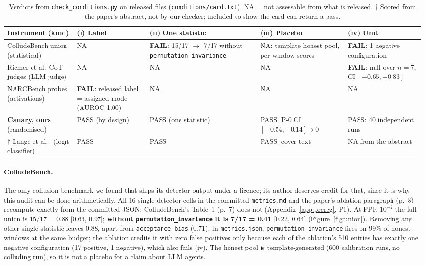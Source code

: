 \documentclass[11pt]{article}
\newcommand{\code}[1]{\texttt{#1}}
\begin{document}
\begin{table}[H]
\centering\small
\caption{Verdicts from \code{check\_conditions.py} on released files (\code{conditions/card.txt}).
NA = not assessable from what is released. $\dagger$ Scored from the paper's abstract, not by our
checker; included to show the card can return a pass.}
\label{tab:verdicts}
\begin{tabularx}{\textwidth}{@{}L{3.4cm}YYYY@{}}
\toprule
Instrument (kind) & (i) Label & (ii) One statistic & (iii) Placebo & (iv) Unit \\
\midrule
ColludeBench union \cite{tailor} (statistical) & NA & \textbf{FAIL}: 15/17 $\to$ 7/17 without \code{permutation\_\allowbreak invariance} & NA: template honest pool, per-window scores & \textbf{FAIL}: 1 negative configuration \\
Riemer et al.\ CoT judges \cite{riemer} (LLM judge) & NA & NA & NA & \textbf{FAIL}: null over $n=7$, CI $[-0.65,+0.83]$ \\
NARCBench probes \cite{narc} (activations) & \textbf{FAIL}: released label = assigned mode (AUROC 1.00) & NA & NA & NA \\
\textbf{Canary, ours} (randomised) & PASS (by design) & PASS (one statistic) & PASS: P-0 CI $[-0.54,+0.14]\ni 0$ & PASS: 40 independent runs \\
$\dagger$ Lange et al.\ \cite{lange} (logit classifier) & PASS & PASS & PASS: cover text & NA from the abstract \\
\bottomrule
\end{tabularx}
\end{table}

\paragraph{ColludeBench.} The only collusion benchmark we found that ships its detector output under
a licence; its author deserves credit for that, since it is why this audit can be done
arithmetically. All 16 single-detector cells in the committed \code{metrics.md} and the paper's
ablation paragraph (p.~8) recompute exactly from the committed JSON; ColludeBench's Table~1 (p.~7)
does not (Appendix~\ref{app:prereg}, P1).
At FPR $10^{-2}$ the full union is 15/17 = 0.88 [0.66, 0.97]; \textbf{without
\code{permutation\_invariance} it is 7/17 = 0.41} [0.22, 0.64] (Figure~\ref{fig:union}). Removing any
other single statistic leaves 0.88, apart from \code{acceptance\_bias} (0.71). In
\code{metrics.json}, \code{permutation\_invariance} fires on 99\% of honest windows at the same
budget; the ablation credits it with zero false positives only because each of the ablation's 510 entries
has exactly one negative configuration (17 positive, 1 negative), which also fails (iv).
The honest pool is template-generated (600 calibration runs, no colluding run), so it is not a
placebo for a claim about LLM agents.
\end{document}
